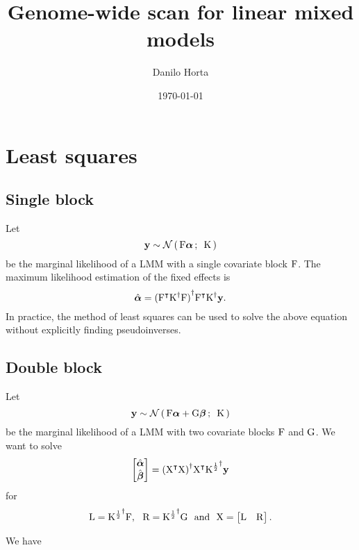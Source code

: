 \documentclass[twocolumn,draft]{article}
\title{Genome-wide scan for linear mixed models}
\author{Danilo Horta}
\date{\today}
\begin{document}
	\maketitle

\section{Least squares}

\subsection{Single block}

Let
\begin{equation*}
  \mathbf{y} \sim \mathcal{N}\left(\, {\mathrm{F}\boldsymbol{\alpha}} \,;\,~{\mathrm{K}} \,\right)
\end{equation*}
be the marginal likelihood of a LMM with a single covariate block $\mathrm{F}$.
The maximum likelihood estimation of the fixed effects is
\begin{equation*}
	\hat{\boldsymbol{\alpha}} = {({\mathrm{F}}^\intercal{\mathrm{K}}^{\dagger}\mathrm{F})}^{\dagger}
	               {\mathrm{F}}^\intercal{\mathrm{K}}^{\dagger}\mathbf{y}.
\end{equation*}
In practice, the method of least squares can be used to solve the above
equation without explicitly finding pseudoinverses.

\subsection{Double block}

Let
\begin{equation*}
  \mathbf{y} \sim \mathcal{N}\left(\, {\mathrm{F}\boldsymbol{\alpha} + \mathrm{G}\boldsymbol{\beta}} \,;\,~{\mathrm{K}} \,\right)
\end{equation*}
be the marginal likelihood of a LMM with two covariate blocks $\mathrm{F}$ and
$\mathrm{G}$.
We want to solve
\begin{equation*}
	\begin{bmatrix}
		\hat{\boldsymbol{\alpha}} \\
		\hat{\boldsymbol{\beta}}
	\end{bmatrix} = {({\mathrm{X}}^\intercal\mathrm{X})}^{\dagger}{\mathrm{X}}^\intercal{\mathrm{K}^{\frac{1}{2}}}^{\dagger}\mathbf{y}
\end{equation*}
for
\begin{equation*}
\mathrm{L} = {\mathrm{K}^{\frac{1}{2}}}^{\dagger}\mathrm{F},~~ \mathrm{R} = {\mathrm{K}^{\frac{1}{2}}}^{\dagger}\mathrm{G}~~\text{and}~~
	\mathrm{X} =
		\begin{bmatrix}
			\mathrm{L} & \mathrm{R}
		\end{bmatrix}.
\end{equation*}

We have
\end{document}
